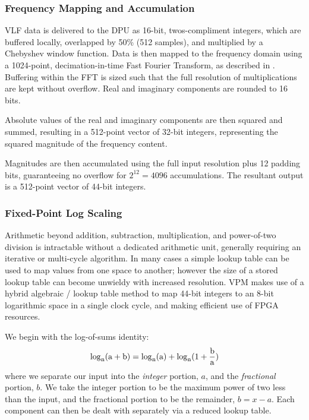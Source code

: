 \subsubsection{Frequency Mapping and Accumulation}
VLF data is delivered to the DPU as 16-bit, twos-compliment integers, which are buffered locally, overlapped by 50\% (512 samples), and multiplied by a Chebyshev window function. Data is then mapped to the frequency domain using a 1024-point, decimation-in-time Fast Fourier Transform, as described in \cite{Oppenheim_Schafer}. Buffering within the FFT is sized such that the full resolution of multiplications are kept without overflow. Real and imaginary components are rounded to 16 bits.

Absolute values of the real and imaginary components are then squared and summed, resulting in a 512-point vector of 32-bit integers, representing the squared magnitude of the frequency content.

Magnitudes are then accumulated using the full input resolution plus 12 padding bits, guaranteeing no overflow for $2^{12} = 4096 $ accumulations. The resultant output is a 512-point vector of 44-bit integers.

\subsubsection{Fixed-Point Log Scaling}
Arithmetic beyond addition, subtraction, multiplication, and power-of-two division is intractable without a dedicated arithmetic unit, generally requiring an iterative or multi-cycle algorithm. In many cases a simple lookup table can be used to map values from one space to another; however the size of a stored lookup table can become unwieldy with increased resolution. VPM makes use of a hybrid algebraic / lookup table method to map 44-bit integers to an 8-bit logarithmic space in a single clock cycle, and making efficient use of FPGA resources.

We begin with the log-of-sums identity:
\begin{equation}
\rm{log}_{n}(a + b) = \rm{log}_n (a) + \rm{log}_n(1 + \frac{b}{a})
\end{equation}
where we separate our input into the \emph{integer} portion, $a$, and the \emph{fractional} portion, $b$. We take the integer portion to be the maximum power of two less than the input, and the fractional portion to be the remainder, $b = x - a$. Each component can then be dealt with separately via a reduced lookup table.

